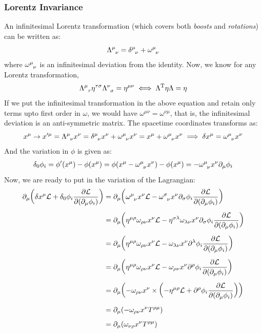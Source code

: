 \subsubsection{Lorentz Invariance}
An infinitesimal Lorentz transformation (which covers both \textit{boosts} and \textit{rotations}) can be written as:
$$\tsr{\Lambda}{\mu}{\nu} =\tsr{\delta}{\mu}{\nu}+\tsr{\omega}{\mu}{\nu} $$
where $\tsr{\omega}{\mu}{\nu}$ is an infinitesimal deviation from the identity. Now, we know for any Lorentz transformation, $$\tsr{\Lambda}{\mu}{\tau}\eta^{\tau\sigma}\tsr{\Lambda}{\nu}{\sigma} = \eta^{\mu\nu} \iff \Lambda^{\mathrm{T}} \eta \Lambda = \eta$$
If we put the infinitesimal transformation in the above equation and retain only terms upto first order in $\omega$, we would have $\omega^{\mu\nu} = \omega^{\nu\mu}$, that is, the infinitesimal deviation is an anti-symmetric matrix. The spacetime coordinates transforms as:
$$x^\mu \rightarrow x'^\mu = \tsr{\Lambda}{\mu}{\nu} x^\nu = \tsr{\delta}{\mu}{\nu}x^\nu + \tsr{\omega}{\mu}{\nu} x^\nu = x^\mu + \tsr{\omega}{\mu}{\nu} x^\nu \implies \delta x^\mu = \tsr{\omega}{\mu}{\nu} x^\nu$$
And the variation in $\phi$ is given as:
\begin{align*}
    \delta_0\phi_i = \phi'(x^\mu) - \phi(x^\mu)=\phi(x^\mu - \tsr{\omega}{\mu}{\nu} x^\nu) - \phi(x^\mu) = -\tsr{\omega}{\mu}{\nu} x^\nu\partial_\mu\phi_i
\end{align*}
Now, we are ready to put in the variation of the Lagrangian:
\begin{align*}
    \partial_\mu \qty(
        \delta x^\mu \SL 
        + \delta_0 \phi_i \pdv{\SL}{(\partial_\mu \phi_i)}
    )
    &= \partial_\mu \qty(
        \tsr{\omega}{\mu}{\nu} x^\nu \SL 
        -\tsr{\omega}{\sigma}{\nu} x^\nu\partial_\sigma\phi_i \pdv{\SL}{(\partial_\mu \phi_i)}
   ) \\[0.5em]
    &= \partial_\mu \qty(\eta^{\mu\rho}\omega_{\rho\nu} x^\nu \SL 
        -\eta^{\sigma\lambda}\omega_{\lambda\nu}  x^\nu\partial_\sigma\phi_i \pdv{\SL}{(\partial_\mu \phi_i)}
           ) \\[0.5em]
    &= \partial_\mu \qty(\eta^{\mu\rho}\omega_{\rho\nu} x^\nu \SL 
        -\omega_{\lambda\nu}  x^\nu\partial^\lambda\phi_i \pdv{\SL}{(\partial_\mu \phi_i)}
           ) \\[0.5em]
    &= \partial_\mu \qty(\eta^{\mu\rho}\omega_{\rho\nu} x^\nu \SL 
        -\omega_{\rho\nu}  x^\nu\partial^\rho\phi_i \pdv{\SL}{(\partial_\mu \phi_i)}
           ) \\[0.5em]
    &= \partial_\mu \qty(-\omega_{\rho\nu} x^\nu \times \qty(-\eta^{\mu\rho} \SL 
        +\partial^\rho\phi_i \pdv{\SL}{(\partial_\mu \phi_i)}
           )) \\[0.5em]
    &= \partial_\mu \qty(-\omega_{\rho\nu} x^\nu T^{\rho\mu}) \\[0.5em]
    &=\partial_\mu \qty(\omega_{\nu\rho} x^\nu T^{\rho\mu})
\end{align*}
